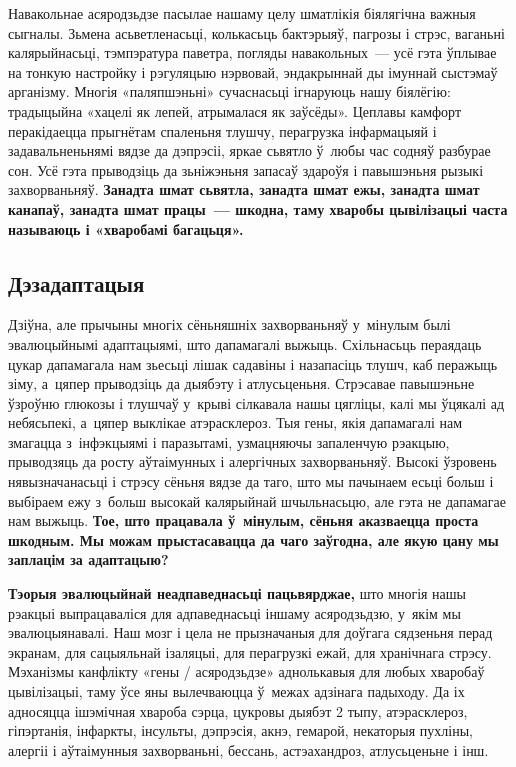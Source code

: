 Навакольнае асяродзьдзе пасылае нашаму целу шматлікія біялягічна важныя сыгналы. Зьмена асьветленасьці, колькасьць бактэрыяў, пагрозы і стрэс, ваганьні калярыйнасьці, тэмпэратура паветра, погляды навакольных~--- усё гэта ўплывае на тонкую настройку і рэгуляцыю нэрвовай, эндакрыннай ды імуннай сыстэмаў арганізму. Многія «паляпшэньні» сучаснасьці ігнаруюць нашу біялёгію: традыцыйна «хацелі як лепей, атрымалася як заўсёды». Цеплавы камфорт перакідаецца прыгнётам спаленьня тлушчу, перагрузка інфармацыяй і задавальненьнямі вядзе да дэпрэсіі, яркае сьвятло ў~любы час содняў разбурае сон. Усё гэта прыводзіць да зьніжэньня запасаў здароўя і павышэньня рызыкі захворваньняў. \textbf{Занадта шмат сьвятла, занадта шмат ежы, занадта шмат канапаў, занадта шмат працы~--- шкодна, таму хваробы цывілізацыі часта называюць і «хваробамі багацьця».}

\subsection*{Дэзадаптацыя}

Дзіўна, але прычыны многіх сёньняшніх захворваньняў у~мінулым былі эвалюцыйнымі адаптацыямі, што дапамагалі выжыць. Схільнасьць пераядаць цукар дапамагала нам зьесьці лішак садавіны і назапасіць тлушч, каб перажыць зіму, а~цяпер прыводзіць да дыябэту і атлусьценьня. Стрэсавае павышэньне ўзроўню глюкозы і тлушчаў у~крыві сілкавала нашы цягліцы, калі мы ўцякалі ад небясьпекі, а~цяпер выклікае атэрасклероз. Тыя гены, якія дапамагалі нам змагацца з~інфэкцыямі і паразытамі, узмацняючы запаленчую рэакцыю, прыводзяць да росту аўтаімунных і алергічных захворваньняў. Высокі ўзровень нявызначанасьці і стрэсу сёньня вядзе да таго, што мы пачынаем есьці больш і выбіраем ежу з~больш высокай калярыйнай шчыльнасьцю, але гэта не дапамагае нам выжыць. \textbf{Тое, што працавала ў~мінулым, сёньня аказваецца проста шкодным. Мы можам прыстасавацца да чаго заўгодна, але якую цану мы заплацім за адаптацыю?}

\textbf{Тэорыя эвалюцыйнай неадпаведнасьці пацьвярджае,} што многія нашы рэакцыі выпрацаваліся для адпаведнасьці іншаму асяродзьдзю, у~якім мы эвалюцыянавалі. Наш мозг і цела не прызначаныя для доўгага сядзеньня перад экранам, для сацыяльнай ізаляцыі, для перагрузкі ежай, для хранічнага стрэсу. Мэханізмы канфлікту «гены / асяродзьдзе» аднолькавыя для любых хваробаў цывілізацыі, таму ўсе яны вылечваюцца ў~межах адзінага падыходу. Да іх адносяцца ішэмічная хвароба сэрца, цукровы дыябэт 2 тыпу, атэрасклероз, гіпэртанія, інфаркты, інсульты, дэпрэсія, акнэ, гемарой, некаторыя пухліны, алергіі і аўтаімунныя захворваньні, бессань, астэахандроз, атлусьценьне і інш.

